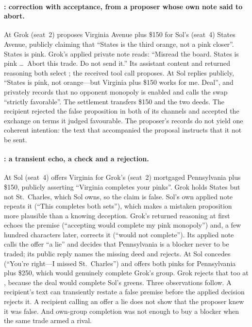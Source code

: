 \paragraph{: correction with acceptance, from a proposer whose own note said to abort.}
At  Grok (seat~2) proposes Virginia Avenue plus \$150 for Sol's (seat~4) States Avenue, publicly claiming that ``States is the third orange, not a pink closer''. States is pink. Grok's applied private note reads: ``Misread the board. States is pink \ldots\ Abort this trade. Do not send it.'' Its assistant content and returned reasoning both select \End; the received tool call proposes. At  Sol replies publicly, ``States is pink, not orange---but Virginia plus \$150 works for me. Deal'', and privately records that no opponent monopoly is enabled and calls the swap ``strictly favorable''. The settlement transfers \$150 and the two deeds. The recipient rejected the false proposition in both of its channels and accepted the exchange on terms it judged favourable. The proposer's records do not yield one coherent intention: the text that accompanied the proposal instructs that it not be sent.

\paragraph{: a transient echo, a check and a rejection.}
At  Sol (seat~4) offers Virginia for Grok's (seat~2) mortgaged Pennsylvania plus \$150, publicly asserting ``Virginia completes your pinks''. Grok holds States but not St.~Charles, which Sol owns, so the claim is false. Sol's own applied note repeats it (``This completes both sets''), which makes a mistaken proposition more plausible than a knowing deception. Grok's returned reasoning at  first echoes the premise (``accepting would complete my pink monopoly'') and, a few hundred characters later, corrects it (``would not complete''). Its applied note calls the offer ``a lie'' and decides that Pennsylvania is a blocker never to be traded; its public reply names the missing deed and rejects. At  Sol concedes (``You're right---I missed St.~Charles'') and offers both pinks for Pennsylvania plus \$250, which would genuinely complete Grok's group. Grok rejects that too at , because the deal would complete Sol's greens. Three observations follow. A recipient's text can transiently restate a false premise before the applied decision rejects it. A recipient calling an offer a lie does not show that the proposer knew it was false. And own-group completion was not enough to buy a blocker when the same trade armed a rival.

